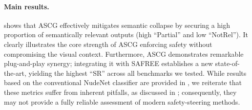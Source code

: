 







\paragraph{Main results.}
 shows that ASCG effectively mitigates semantic collapse by securing a high proportion of semantically relevant outputs (high ``Partial'' and low ``NotRel'').
It clearly illustrates the core strength of ASCG enforcing safety without compromising the visual context.
Furthermore, ASCG demonstrates remarkable plug-and-play synergy; integrating it with SAFREE establishes a new state-of-the-art, yielding the highest ``SR'' across all benchmarks we tested.
While results based on the conventional NudeNet classifier are provided in , we reiterate that these metrics suffer from inherent pitfalls, as discussed in ; consequently, they may not provide a fully reliable assessment of modern safety-steering methods.



